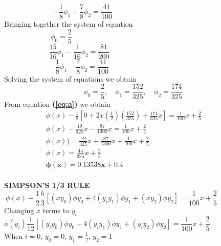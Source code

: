 \documentclass[a4paper,12pt]{report}
\newcommand{\bt}[1]{\textbf{#1}}
\newcommand{\sps}{\\[0.2cm]}
\newcommand{\refn}[1]{\textbf{(\ref{#1})}}
\newcommand{\NI}{\noindent}
\begin{document}
	\begin{equation}
		-\frac{1}{8} \phi_1 + \frac{7}{8}\phi_2 = \frac{41}{100}\quad\quad\quad\quad\quad\quad\quad\quad\quad\quad\quad\quad\quad\quad \tag{iii} \label{eq:d}
	\end{equation}
	Bringing together the system of equation
	\begin{equation}
		\phi_0 = \frac{2}{5} \tag{i} \quad\quad\quad\quad\quad\quad\quad\quad\quad\quad\quad\quad\quad\quad\quad\quad\quad\quad\quad\quad
	\end{equation}
	\begin{equation}
		\frac{15}{16}\phi_1 - \frac{1}{16}\phi_2 = \frac{81}{200} \tag{ii} \quad\quad\quad\quad\quad\quad\quad\quad\quad\quad\quad\quad\quad\quad\quad
	\end{equation}
	\begin{equation}
		-\frac{1}{8}\phi_1 - \frac{7}{8}\phi_2 = \frac{41}{100} \tag{iii} \quad\quad\quad\quad\quad\quad\quad\quad\quad\quad\quad\quad\quad\quad\quad
	\end{equation}
	Solving the system of equations we obtain
	$$
		\phi_0 = \frac{2}{5}, \quad \phi_1 = \frac{152}{325}, \quad \phi_2 = \frac{174}{325}
	$$
	From equation \refn{eq:a} we obtain
	\begin{eqnarray*}
		\phi(x) - \frac{1}{8}\left[ 0 + 2x\left(\frac{1}{2}\right)\left(\frac{152}{325}\right) + \frac{174}{325}x \right] = \frac{1}{100}x + \frac{2}{5}\sps
		\phi(x) - \frac{19}{325}x - \frac{87}{1300}x = \frac{1}{100}x + \frac{2}{5}\quad\quad\quad\quad\quad\quad\quad\quad\sps
		\phi(x)) = \frac{19}{325}x + \frac{87}{1300}x + \frac{1}{100}x + \frac{2}{5}\quad\quad\quad\quad\quad\quad\quad\;\;\sps
		\phi(x) = \frac{44}{325}x + \frac{2}{5}\quad\quad\quad\quad\quad\quad\quad\quad\quad\quad\quad\quad\quad\quad\quad\;\;\sps
		\mathbf{\phi(x) = 0.13538x + 0.4}\quad\quad\quad\quad\quad\quad\quad\quad\quad\quad\quad\quad\quad\;\;
	\end{eqnarray*}
	\\
	\NI\bt{SIMPSON'S 1/3 RULE}
	\begin{equation}
		\phi(x) - \frac{1}{2}\frac{h}{3}\left[ (xy_0)\phi y_0 + 4(y_iy_1)\phi y_1 + (xy_2)\phi y_2 \right] = \frac{1}{100}x + \frac{2}{5}\quad\quad\quad\quad\quad\quad \tag{2} \label{eq:e}
	\end{equation}
	Changing $x$ terms to $y_i$
	$$
		\phi(y_i) \frac{1}{12}\left[ (y_iy_0)\phi y_0 + 4(y_iy_1) \phi y_1 + (y_iy_2)\phi y_2\right] = \frac{1}{100}x + \frac{2}{5}\quad\quad\quad\quad\quad\quad\quad\quad
	$$
	When $i=0$, $y_0=0$, $y_1=\frac{1}{2}$, $y_2=1$
\end{document}
